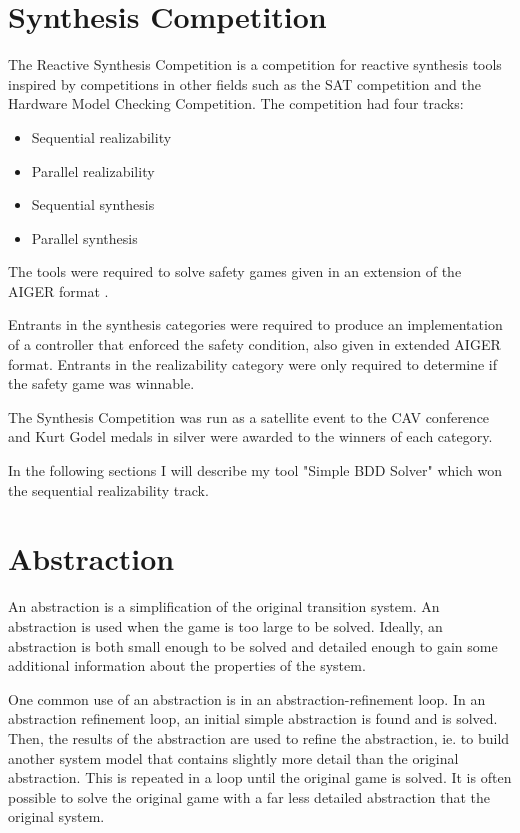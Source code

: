 \section{Synthesis Competition}

The Reactive Synthesis Competition is a competition for reactive synthesis tools inspired by competitions in other fields such as the SAT competition and the Hardware Model Checking Competition. The competition had four tracks:
\begin{itemize}
    \item Sequential realizability
    \item Parallel realizability
    \item Sequential synthesis
    \item Parallel synthesis
\end{itemize}

The tools were required to solve safety games given in an extension of the AIGER format \cite{aiger}. 

Entrants in the synthesis categories were required to produce an implementation of a controller that enforced the safety condition, also given in extended AIGER format. Entrants in the realizability category were only required to determine if the safety game was winnable.

The Synthesis Competition was run as a satellite event to the CAV conference and Kurt Godel medals in silver were awarded to the winners of each category.

In the following sections I will describe my tool "Simple BDD Solver" which won the sequential realizability track.



\section{Abstraction}
An abstraction is a simplification of the original transition system. An abstraction is used when the game is too large to be solved. Ideally, an abstraction is both small enough to be solved and detailed enough to gain some additional information about the properties of the system. 

One common use of an abstraction is in an abstraction-refinement loop. In an abstraction refinement loop, an initial simple abstraction is found and is solved. Then, the results of the abstraction are used to refine the abstraction, ie. to build another system model that contains slightly more detail than the original abstraction. This is repeated in a loop until the original game is solved. It is often possible to solve the original game with a far less detailed abstraction that the original system. 

